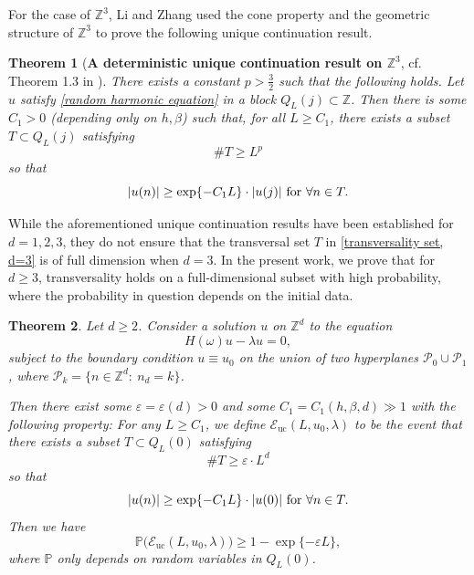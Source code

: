 \documentclass[11pt,reqno,UTF8,twoside]{amsart}
\newcommand{\Z}{\mathbb{Z}}
\renewcommand{\P}{\mathbb{P}}
\newtheorem{thm}{Theorem}[section]
\theoremstyle{definition}
\numberwithin{equation}{section}
\begin{document}
For the case  of $\Z^3$, Li and Zhang \cite{LZ22} used the cone property and the geometric structure of $\mathbb{Z}^3$ to prove the following unique continuation result.
\begin{thm}[{\bf A deterministic unique continuation result  on  $\Z^3$}, cf. Theorem 1.3 in \cite{LZ22}]\label{UC for d=3} There exists a constant $p>\frac{3}{2}$ such that the following holds. Let $u$ satisfy \eqref{random harmonic equation} in a  block   $Q_L(j) \subset \mathbb{Z}$. Then there is some  $C_1>0$ (depending only  on $h,\beta$) such that,  for all $L\geq C_1$, there exists a subset $T \subset Q_L(j)$ satisfying \begin{equation}\label{transversality set, d=3}
  \# T\geq L^p
\end{equation} 
  so that 
  \begin{equation}\label{transversality, d=3}
      |u(n)| \geq \exp\{-C_1 L\} \cdot |u(j)|\ {\rm for}\ \forall  n\in T.
  \end{equation}
\end{thm}


While the aforementioned unique continuation results have been established for $d=1,2,3$, they do not ensure that the transversal set $T$ in \eqref{transversality set, d=3} is of full dimension when $d=3$. In the present work, we prove that for $d \geq 3$, transversality holds on a full-dimensional subset with high probability, where the probability in question depends on the initial data.


\begin{thm}\label{UC for d arbitrary}
 Let $d \geq 2$. Consider a solution $u$ on $\mathbb{Z}^d$ to the equation
    \[
    H(\omega) u - \lambda u = 0,
    \]
    subject to the boundary condition $u \equiv u_0$ on the union of two hyperplanes $\mathcal{P}_0 \cup \mathcal{P}_1$, where $\mathcal{P}_k = \{ n \in \mathbb{Z}^d: \ n_d = k \}$.
    
Then there exist  some $\varepsilon=\varepsilon(d)>0$ and  some $C_1 = C_1(h, \beta, d) \gg 1$ with the following property: For any $L \geq C_1 $, we define  $\mathcal{E}_{\mathrm{uc}}(L , u_0, \lambda)$ to be the event  that there exists a subset $T \subset Q_L(0)$ satisfying
   \begin{equation}\label{transversality set, d arbitrary}
        \# T\geq \varepsilon  \cdot L^d
  \end{equation}
  so that 
  \begin{equation}\label{transversality, d arbitrary}
      |u(n)| \geq \exp\{-C_1 L \} \cdot |u(0)| \ {\rm for}\  \forall  n\in T.
  \end{equation}
  Then we have 
    \[
    \mathbb{P}\big( \mathcal{E}_{\mathrm{uc}}(L, u_0, \lambda) \big) \geq 1 - \exp\{-\varepsilon  L\}, 
    \]
    where $\P$ only depends  on random variables in $Q_L(0)$.
  \end{thm}
\end{document}
